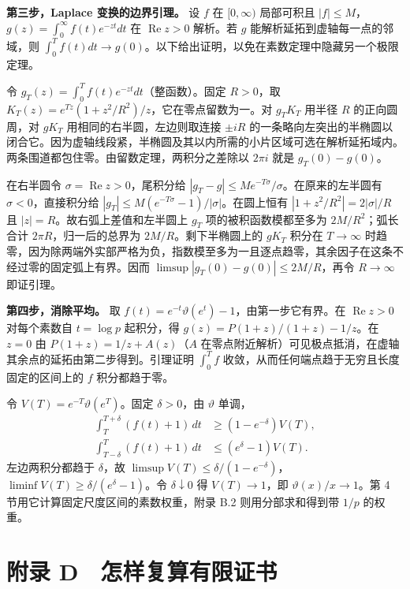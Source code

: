 \documentclass[11pt,a4paper]{article}
\begin{document}
\textbf{第三步，Laplace 变换的边界引理。} 设 \(f\) 在 \([0,\infty)\) 局部可积且 \(|f|\le M\)，\(g(z)=\int_0^\infty f(t)e^{-zt}dt\) 在 \(\operatorname{Re}z>0\) 解析。若 \(g\) 能解析延拓到虚轴每一点的邻域，则 \(\int_0^T f(t)dt\to g(0)\)。以下给出证明，以免在素数定理中隐藏另一个极限定理。

令 \(g_T(z)=\int_0^Tf(t)e^{-zt}dt\)（整函数）。固定 \(R>0\)，取 \(K_T(z)=e^{Tz}(1+z^2/R^2)/z\)，它在零点留数为一。对 \(g_TK_T\) 用半径 \(R\) 的正向圆周，对 \(gK_T\) 用相同的右半圆，左边则取连接 \(\pm iR\) 的一条略向左突出的半椭圆以闭合它。因为虚轴线段紧，半椭圆及其以内所需的小片区域可选在解析延拓域内。两条围道都包住零。由留数定理，两积分之差除以 \(2\pi i\) 就是 \(g_T(0)-g(0)\)。

在右半圆令 \(\sigma=\operatorname{Re}z>0\)，尾积分给 \(|g_T-g|\le Me^{-T\sigma}/\sigma\)。在原来的左半圆有 \(\sigma<0\)，直接积分给 \(|g_T|\le M(e^{-T\sigma}-1)/|\sigma|\)。在圆上恒有 \(|1+z^2/R^2|=2|\sigma|/R\) 且 \(|z|=R\)。故右弧上差值和左半圆上 \(g_T\) 项的被积函数模都至多为 \(2M/R^2\)；弧长合计 \(2\pi R\)，归一后的总界为 \(2M/R\)。剩下半椭圆上的 \(gK_T\) 积分在 \(T\to\infty\) 时趋零，因为除两端外实部严格为负，指数模至多为一且逐点趋零，其余因子在这条不经过零的固定弧上有界。因而 \(\limsup|g_T(0)-g(0)|\le2M/R\)，再令 \(R\to\infty\) 即证引理。

\textbf{第四步，消除平均。} 取 \(f(t)=e^{-t}\vartheta(e^t)-1\)，由第一步它有界。在 \(\operatorname{Re}z>0\) 对每个素数自 \(t=\log p\) 起积分，得 \(g(z)=P(1+z)/(1+z)-1/z\)。在 \(z=0\) 由 \(P(1+z)=1/z+A(z)\)（\(A\) 在零点附近解析）可见极点抵消，在虚轴其余点的延拓由第二步得到。引理证明 \(\int_0^T f\) 收敛，从而任何端点趋于无穷且长度固定的区间上的 \(f\) 积分都趋于零。

令 \(V(T)=e^{-T}\vartheta(e^T)\)。固定 \(\delta>0\)，由 \(\vartheta\) 单调， \[
 \begin{aligned}
 \int_T^{T+\delta}(f(t)+1)\,dt&\ge(1-e^{-\delta})V(T),\\
 \int_{T-\delta}^T(f(t)+1)\,dt&\le(e^\delta-1)V(T).
 \end{aligned}
\] 左边两积分都趋于 \(\delta\)，故 \(\limsup V(T)\le\delta/(1-e^{-\delta})\)，\(\liminf V(T)\ge\delta/(e^\delta-1)\)。令 \(\delta\downarrow0\) 得 \(V(T)\to1\)，即 \(\vartheta(x)/x\to1\)。第 4 节用它计算固定尺度区间的素数权重，附录 B.2 则用分部求和得到带 \(1/p\) 的权重。

\section{附录 D　怎样复算有限证书}\label{ux9644ux5f55-d-ux600eux6837ux590dux7b97ux6709ux9650ux8bc1ux4e66}
\end{document}

